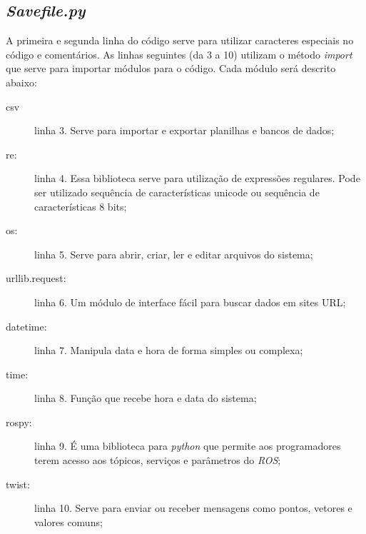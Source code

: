 \subsection{\textit{Savefile.py}}
\label{sec:Savefile.py}

	\begin{figure}[H]
		\centering
	\end{figure}
	
A primeira e segunda linha do código serve para utilizar caracteres especiais no código e comentários. As linhas seguintes (da 3 a 10) utilizam o método \textit{import} que serve para importar módulos para o código. Cada módulo será descrito abaixo:
\begin{description}
    \item[csv] linha 3. Serve para importar e exportar planilhas e bancos de dados;
    \item[re:] linha 4. Essa biblioteca serve para utilização de expressões regulares. Pode ser utilizado sequência de características unicode ou sequência de características 8 bits;
    \item[os:] linha 5. Serve para abrir, criar, ler e editar arquivos do sistema;
    \item[urllib.request:] linha 6. Um módulo de interface fácil para buscar dados em sites URL;
    \item[datetime:] linha 7. Manipula data e hora de forma simples ou complexa;
    \item[time:] linha 8. Função que recebe hora e data do sistema;
    \item[rospy:] linha 9. É uma biblioteca para \textit{python} que permite aos programadores terem acesso aos tópicos, serviços e parâmetros do \textit{ROS};
    \item[twist:] linha 10. Serve para enviar ou receber mensagens como pontos, vetores e valores comuns;
\end{description}

	\begin{figure}[H]
		\centering
\end{figure}
	
